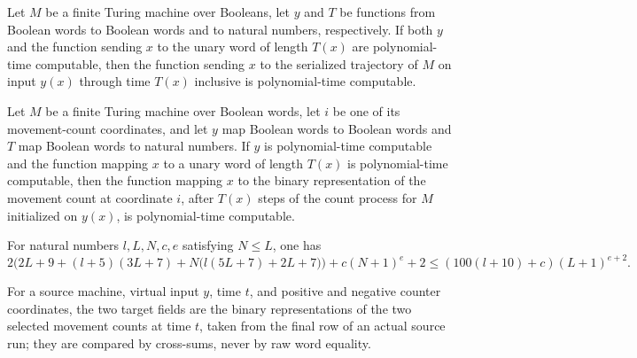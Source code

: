 \begin{lemma}
\label{Complexity.clTrajectory_native}
\leanok
{}
Let $M$ be a finite Turing machine over Booleans, let $y$ and $T$ be functions from
Boolean words to Boolean words and to natural numbers, respectively. If both $y$ and the
function sending $x$ to the unary word of length $T(x)$ are polynomial-time computable,
then the function sending $x$ to the serialized trajectory of $M$ on input $y(x)$
through time $T(x)$ inclusive is polynomial-time computable.
\end{lemma}

\begin{lemma}
\label{Complexity.clFinalCount_native}
\leanok
{}
Let $M$ be a finite Turing machine over Boolean words, let $i$ be one of its
movement-count coordinates, and let $y$ map Boolean words to Boolean words and $T$ map
Boolean words to natural numbers. If $y$ is polynomial-time computable and the function
mapping $x$ to a unary word of length $T(x)$ is polynomial-time computable, then the
function mapping $x$ to the binary representation of the movement count at coordinate
$i$, after $T(x)$ steps of the count process for $M$ initialized on $y(x)$, is
polynomial-time computable.
\end{lemma}

\begin{lemma}
\label{Complexity.clQuery_budget}
\leanok
{}
For natural numbers $l,L,N,c,e$ satisfying $N\le L$, one has
\[
2\bigl(2L+9+(l+5)(3L+7)+N\bigl(l(5L+7)+2L+7\bigr)\bigr)+c(N+1)^e+2\le
(100(l+10)+c)(L+1)^{e+2}.
\]
\end{lemma}

\begin{definition}
\label{Complexity.clSearchTarget}
\leanok
{}
For a source machine, virtual input $y$, time $t$, and positive and negative counter coordinates, the two target fields are the binary representations of the two selected movement counts at time $t$, taken from the final row of an actual source run; they are compared by cross-sums, never by raw word equality.
\end{definition}

